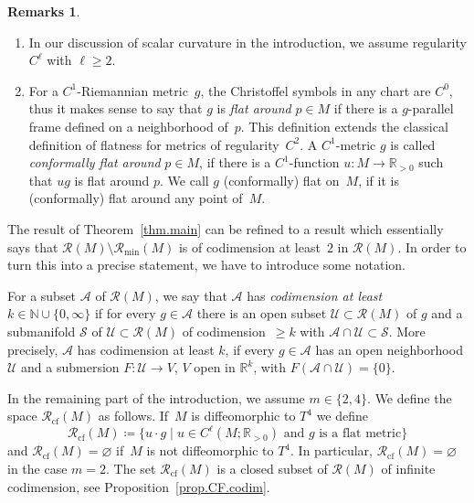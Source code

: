 \documentclass[pdftex]{sigma}
\newcommand\ceq{\coloneqq}
\newcommand\<{\langle}
\renewcommand\>{\rangle}
\newcommand{\NN}{\mathbb N}
\newcommand{\RR}{\mathbb R}
\newcommand{\maA}{\mathcal A}
\newcommand{\maR}{\mathcal R}
\newcommand{\maS}{\mathcal S}
\newcommand{\maU}{\mathcal U}
\theoremstyle{definition}
\newtheorem{Remarks}[Theorem]{Remarks}
\let\define\emph
\newcommand\={\,=\,}
\newcommand\Rmin{\maR_{\mathrm{min}}}
\newcommand\Rcf{\maR_{\mathrm{cf}}}
\numberwithin{equation}{section}
\begin{document}
\begin{Remarks}
\begin{enumerate}[(1)]
When proving Theorems~\ref{thm.main} and~\ref{thm.main.2}, we apply the submersion theorem in the Banach space setting and therefore restrict to $\ell<\infty$. We will discuss how to extend the results to $\ell=\infty$ in Remark~\ref{rem.regularity} and at the ends of the proofs of Theorems~\ref{thm.main.2} and~\ref{thm.main}.
\item In our discussion of scalar curvature in the introduction, we assume regularity $C^\ell$ with $\ell\geq 2$.
\item For a $C^1$-Riemannian metric~$g$, the Christoffel symbols in any chart are $C^0$, thus it makes sense to say that $g$ is \define{flat around} $p\in M$ if there is a $g$-parallel frame defined on a neighborhood of~$p$. This definition extends the classical definition of flatness for metrics of regularity~$C^2$.
A $C^1$-metric $g$ is called \define{conformally flat around} $p\in M$, if there is a $C^1$-function $u\colon M\to \RR_{>0}$ such that $ug$ is flat around $p$. We call $g$ (conformally) flat on~$M$, if it is (conformally) flat around any point of~$M$.
\end{enumerate}
\end{Remarks}

The result of Theorem~\ref{thm.main} can be refined to a result which essentially says that $\maR(M)\setminus\Rmin(M)$ is of codimension at least~$2$ in $\maR(M)$. In order to turn this into a precise statement, we have to introduce some notation.

For a subset $\maA$ of $\maR(M)$, we say that $\maA$ has
\define{codimension at least $k\in \NN\cup\{0,\infty\}$}
if for every $g\in \maA$ there is an open subset $\maU\subset\maR(M)$ of $g$ and a submanifold $\maS$ of $\maU\subset \maR(M)$ of codimension~$\geq k$ with $\maA\cap \maU\subset \maS$.
More precisely, $\maA$ has
codimension at least $k$, if every $g\in \maA$ has an open neighborhood $\maU$ and a submersion $F\colon\maU\to V$, $V$ open in $\RR^k$, with $F(\mathcal{A}\cap\mathcal{U})=\{0\}$.

In the remaining part of the introduction, we assume $m\in\{2,4\}$.
We define the space $\Rcf(M)$ as follows. If~$M$ is diffeomorphic to $T^4$ we define
\[
\Rcf(M)\ceq \bigl\{u\cdot g\mid u\in C^\ell(M;\RR_{>0}) \text{ and $g$ is a flat metric}\bigr\}
\]
and $\Rcf(M)=\varnothing$ if~$M$ is not diffeomorphic to $T^4$. In particular, $\Rcf(M)=\varnothing$ in the case $m=2$.
The set $\Rcf(M)$ is a closed subset of $\maR(M)$ of infinite codimension, see Proposition~\ref{prop.CF.codim}.
\end{document}

